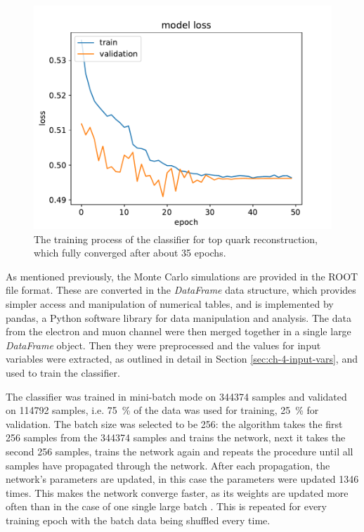 \begin{figure}[h]
    \centering
    \includegraphics[scale=.75]{assets/chap04/model_loss.pdf}
    \caption{The training process of the classifier for top quark reconstruction, which fully converged after about 35 epochs.}
    \label{fig:ch_4_loss}
\end{figure}

As mentioned previously, the Monte Carlo simulations are provided in the ROOT file format. These are converted in the \emph{DataFrame} data structure, which provides simpler access and manipulation of numerical tables, and is implemented by pandas, a Python software library for data manipulation and analysis. The data from the electron and muon channel were then merged together in a single large \emph{DataFrame} object. Then they were preprocessed and the values for input variables were extracted, as outlined in detail in Section \ref{sec:ch-4-input-vars}, and used to train the classifier.

The classifier was trained in mini-batch mode on \num{344374} samples and validated on \num{114792} samples, i.e. \SI{75}{\%} of the data was used for training, \SI{25}{\%} for validation. The batch size was selected to be 256: the algorithm takes the first 256 samples from the \num{344374} samples and trains the network, next it takes the second 256 samples, trains the network again and repeats the procedure until all samples have propagated through the network. After each propagation, the network's parameters are updated, in this case the parameters were updated \num{1346} times. This makes the network converge faster, as its weights are updated more often than in the case of one single large batch \cite{153535}. This is repeated for every training epoch with the batch data being shuffled every time.

